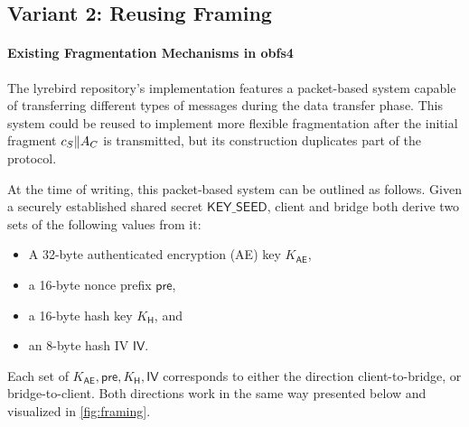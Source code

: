 \subsection{Variant 2: Reusing \obfsfour{} Framing} \label{sssec:variant-framing}

\paragraph{Existing Fragmentation Mechanisms in obfs4}
The lyrebird repository's \obfsfour{} implementation features a packet-based system capable of transferring different types of messages during the data transfer phase. This system could be reused to implement more flexible fragmentation after the initial fragment $c_S \| A_C$ is transmitted, but its construction duplicates part of the \drivel{} protocol.

At the time of writing, this packet-based system can be outlined as follows. Given a securely established shared secret $\mathsf{KEY\_SEED}$, client and bridge both derive two sets of the following values from it:
\begin{itemize}
    \item A 32-byte authenticated encryption (AE) key $K_\mathsf{AE}$,
    \item a 16-byte nonce prefix $\mathsf{pre}$,
    \item a 16-byte hash key $K_\mathsf{H}$, and
    \item an 8-byte hash IV $\mathsf{IV}$.
\end{itemize}

Each set of $K_\mathsf{AE}, \mathsf{pre}, K_\mathsf{H}, \mathsf{IV}$ corresponds to either the direction client-to-bridge, or bridge-to-client. Both directions work in the same way presented below and visualized in \cref{fig:framing}.

